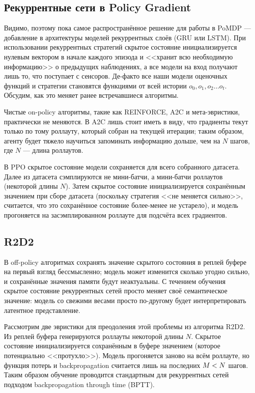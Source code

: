 \subsection{Рекуррентные сети в Policy Gradient}

Видимо, поэтому пока самое распространённое решение для работы в PoMDP --- добавление в архитектуры моделей рекуррентных слоёв (GRU или LSTM). При использовании рекуррентных стратегий скрытое состояние инициализируется нулевым вектором в начале каждого эпизода и <<хранит всю необходимую информацию>> о предыдущих наблюдениях, а все модели на вход получают лишь то, что поступает с сенсоров. Де-факто все наши модели оценочных функций и стратегии становятся функциями от всей истории $o_0, o_1, o_2 \dots o_t$. Обсудим, как это меняет ранее встречавшиеся алгоритмы.

Чистые on-policy алгоритмы, такие как REINFORCE, A2C и мета-эвристики, практически не меняются. В A2C лишь стоит иметь в виду, что градиенты текут только по тому роллауту, который собран на текущей итерации; таким образом, агенту будет тяжело научиться запоминать информацию дольше, чем на $N$ шагов, где $N$ --- длина роллаутов.

В PPO скрытое состояние модели сохраняется для всего собранного датасета. Далее из датасета сэмплируются не мини-батчи, а мини-батчи роллаутов (некоторой длины $N$). Затем скрытое состояние инициализируется сохранённым значением при сборе датасета (поскольку стратегия <<не меняется сильно>>, считается, что это сохранённое состояние более-менее не устарело), и модель прогоняется на засэмплированном роллауте для подсчёта всех градиентов.

\subsection{R2D2}

В off-policy алгоритмах сохранять значение скрытого состояния в реплей буфере на первый взгляд бессмысленно; модель может изменится сколько угодно сильно, и сохранённые значения памяти будут неактуальны. С течением обучения скрытое состояние рекуррентных сетей просто меняет своё семантическое значение: модель со свежими весами просто по-другому будет интерпретировать латентное представление.

Рассмотрим две эвристики для преодоления этой проблемы из алгоритма R2D2. Из реплей буфера генерируются роллауты некоторой длины $N$. Скрытое состояние инициализируется сохранённым в буфере значением (которое потенциально <<протухло>>). Модель прогоняется заново на всём роллауте, но функция потерь и backpropagation считается лишь на последних $M \HM< N$ шагов. Таким образом обучение проводится стандартным для рекуррентных сетей подходом backpropagation through time (BPTT).


